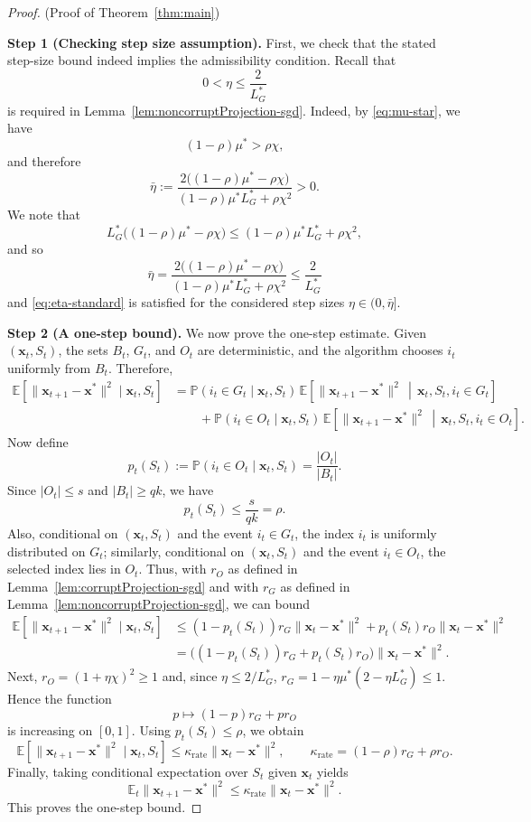 \documentclass[11pt]{article}
\newcommand{\ve}[1]{\mathbf{#1}}
\begin{document}
\begin{proof}{(Proof of Theorem~\ref{thm:main})}

\textbf{Step 1 {(Checking step size assumption)}.} First, we check that the stated step-size bound indeed implies the admissibility condition. Recall {that}
\begin{equation}\label{eq:eta-standard}
0<\eta\le \frac{2}{L_{G}^*}
\end{equation}
{is} required in Lemma~\ref{lem:noncorruptProjection-sgd}.
Indeed, by \eqref{eq:mu-star}, we have
\[
(1-\rho)\mu^*>\rho \chi,
\]
and therefore
\[
\bar\eta:=
\frac{
2\bigl((1-\rho)\mu^*-\rho \chi\bigr)
}{
(1-\rho)\mu^*L_{G}^*+\rho \chi^2
}
>0.
\]
We note that
\[
L_{G}^*\bigl((1-\rho)\mu^*-\rho \chi\bigr)
\le
(1-\rho)\mu^* L_{G}^*+\rho \chi^2,
\]
and so
\[
\bar\eta=
\frac{
2\bigl((1-\rho)\mu^*-\rho \chi\bigr)
}{
(1-\rho)\mu^* L_{G}^*+\rho \chi^2
}
\le
\frac{2}{L_{G}^*}
\]
and \eqref{eq:eta-standard} is satisfied for the considered step sizes $\eta \in (0, \bar{\eta}]$.


\textbf{Step 2 {(A one-step bound)}.} We now prove the one-step estimate. Given $(\ve{x}_t,S_t)$, the sets $B_t$, $G_t$, and $O_t$ are deterministic, and the algorithm chooses $i_t$ uniformly from $B_t$. Therefore,
\begin{align*}
\mathbb{E}\!\left[\|\ve{x}_{t+1}-\ve{x}^*\|^2 \mid \ve{x}_t,S_t\right]
&=
\mathbb{P}(i_t\in G_t\mid \ve{x}_t,S_t)\,
\mathbb{E}\!\left[
\|\ve{x}_{t+1}-\ve{x}^*\|^2
\,\middle|\,
\ve{x}_t,S_t,i_t\in G_t
\right] \\
&\qquad
+
\mathbb{P}(i_t\in O_t\mid \ve{x}_t,S_t)\,
\mathbb{E}\!\left[
\|\ve{x}_{t+1}-\ve{x}^*\|^2
\,\middle|\,
\ve{x}_t,S_t,i_t\in O_t
\right].
\end{align*}
Now define
\[
p_t(S_t):=\mathbb{P}(i_t\in O_t\mid \ve{x}_t,S_t)=\frac{|O_t|}{|B_t|}.
\]
Since $|O_t|\le s$ and {$|B_t|\ge  qk$}, we have
{\[
p_t(S_t)\le \frac{s}{ qk}=\rho.
\]}
Also, conditional on $(\ve{x}_t,S_t)$ and the event $i_t\in G_t$, the index $i_t$ is uniformly distributed on $G_t$; similarly, conditional on $(\ve{x}_t,S_t)$ and the event $i_t\in O_t$, the selected index lies in $O_t$. Thus, with $r_O$ as defined in Lemma~\ref{lem:corruptProjection-sgd} and with $r_G$ as defined in Lemma~\ref{lem:noncorruptProjection-sgd}, we can bound
\begin{align*}
\mathbb{E}\!\left[\|\ve{x}_{t+1}-\ve{x}^*\|^2 \mid \ve{x}_t,S_t\right]
&\le
(1-p_t(S_t))r_G\|\ve{x}_t-\ve{x}^*\|^2
+
p_t(S_t) r_O\|\ve{x}_t-\ve{x}^*\|^2 \\
&=
\bigl((1-p_t(S_t))r_G+p_t(S_t) r_O\bigr)
\|\ve{x}_t-\ve{x}^*\|^2.
\end{align*}
Next, $r_O=(1+\eta \chi)^2\ge 1$ and, since $\eta\le 2/L_{G}^*$,
$
r_G
=
1-\eta\mu^*(2-\eta L_{G}^*)
\le 1.$
Hence the function
\[
p\mapsto (1-p)r_G+pr_O
\]
is increasing on $[0,1]$. Using $p_t(S_t)\le \rho$, we obtain
\[
\mathbb{E}\!\left[\|\ve{x}_{t+1}-\ve{x}^*\|^2 \mid \ve{x}_t,S_t\right]
\le \kappa_{\mathrm{rate}}
\|\ve{x}_t-\ve{x}^*\|^2,
\qquad
\kappa_{\mathrm{rate}}=(1-\rho)r_G+\rho r_O.
\]
Finally, taking conditional expectation over $S_t$ given $\ve{x}_t$ yields
\[
\mathbb{E}_t\|\ve{x}_{t+1}-\ve{x}^*\|^2
\le \kappa_{\mathrm{rate}}
\|\ve{x}_t-\ve{x}^*\|^2.
\]
This proves the one-step bound.


\end{proof}
\end{document}
